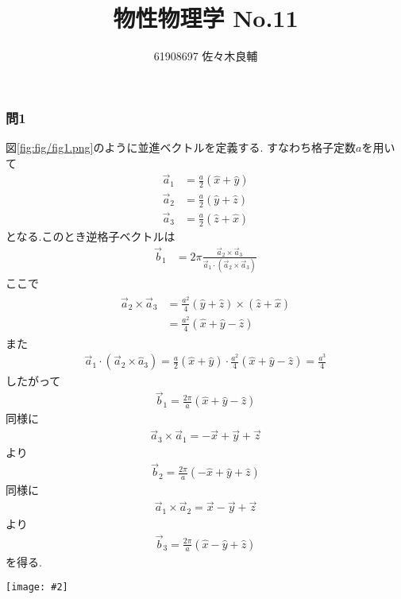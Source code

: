 \documentclass[uplatex,a4j,11pt,dvipdfmx]{jsarticle}
\makeatletter
\def\fgcaption{\def\@captype{figure}\caption}
\newcommand{\mfig}[3][width=15cm]{
\begin{center}
\texttt{[image: \#2]}
\fgcaption{#3 \label{fig:#2}}
\end{center}
}
\makeatother
\begin{document}
\title{物性物理学 No.11}
\author{61908697 佐々木良輔}
\date{}
\maketitle
\subsubsection*{問1}
図\ref{fig:fig/fig1.png}のように並進ベクトルを定義する.
すなわち格子定数$a$を用いて
\begin{align}
  \vec{a}_1&=\frac{a}{2}(\hat{x}+\hat{y})\\
  \vec{a}_2&=\frac{a}{2}(\hat{y}+\hat{z})\\
  \vec{a}_3&=\frac{a}{2}(\hat{z}+\hat{x})
\end{align}
となる.このとき逆格子ベクトルは
\begin{align}
  \vec{b}_1&=2\pi\frac{\vec{a}_2\times\vec{a}_3}{\vec{a}_1\cdot(\vec{a}_2\times\vec{a}_3)}
\end{align}
ここで
\begin{align}
  \begin{split}
    \vec{a}_2\times\vec{a}_3&=\frac{a^2}{4}(\hat{y}+\hat{z})\times(\hat{z}+\hat{x})\\
    &=\frac{a^2}{4}(\hat{x}+\hat{y}-\hat{z})
  \end{split}
\end{align}
また
\begin{align}
  \vec{a}_1\cdot(\vec{a}_2\times\hat{a}_3)=\frac{a}{2}(\hat{x}+\hat{y})\cdot\frac{a^2}{4}(\hat{x}+\hat{y}-\hat{z})=\frac{a^3}{4}
\end{align}
したがって
\begin{align}
  \vec{b}_1=\frac{2\pi}{a}(\hat{x}+\hat{y}-\hat{z})
\end{align}
同様に
\begin{align}
  \vec{a}_3\times\vec{a}_1=-\vec{x}+\vec{y}+\vec{z}
\end{align}
より
\begin{align}
  \vec{b}_2=\frac{2\pi}{a}(-\hat{x}+\hat{y}+\hat{z})
\end{align}
同様に
\begin{align}
  \vec{a}_1\times\vec{a}_2=\vec{x}-\vec{y}+\vec{z}
\end{align}
より
\begin{align}
  \vec{b}_3=\frac{2\pi}{a}(\hat{x}-\hat{y}+\hat{z})
\end{align}
を得る.
\mfig[width=8cm]{fig/fig1.png}{面心立方格子での並進ベクトルの定義}
\end{document}
